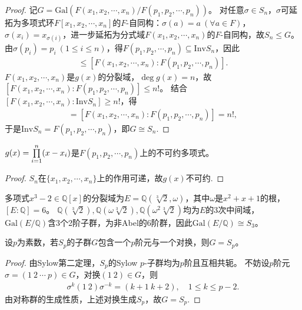 \documentclass[../../main.tex]{subfiles}%
\begin{document}
\begin{proof}
记$G=\mathrm{Gal}(F(x_1,x_2,\cdots,x_n)/F(p_1,p_2,\cdots,p_n))$。
对任意$\sigma\in S_n$，$\sigma$可延拓为多项式环$F[x_1,x_2,\cdots,x_n]$的$F$-自同构：$\sigma(a)=a\ (\forall a\in F)$，$\sigma(x_i)=x_{\sigma(i)}$，进一步延拓为分式域$F(x_1,x_2,\cdots,x_n)$的$F$-自同构，故$S_n\leqslant G$。
由$\sigma(p_i)=p_i\ (1\leqslant i\leqslant n)$，得$F(p_1,p_2,\cdots,p_n)\subseteq \mathrm{Inv}S_n$，因此
\begin{align*}
[F(x_1,x_2,\cdots,x_n):\mathrm{Inv}S_n]\leqslant [F(x_1,x_2,\cdots,x_n):F(p_1,p_2,\cdots,p_n)].
\end{align*}
$F(x_1,x_2,\cdots,x_n)$是$g(x)$的分裂域，$\deg g(x)=n$，故$[F(x_1,x_2,\cdots,x_n):F(p_1,p_2,\cdots,p_n)]\leqslant n!$。
结合$[F(x_1,x_2,\cdots,x_n):\mathrm{Inv}S_n]\geqslant n!$，得
\begin{align*}
[F(x_1,x_2,\cdots,x_n):\mathrm{Inv}S_n]=[F(x_1,x_2,\cdots,x_n):F(p_1,p_2,\cdots,p_n)]=n!,
\end{align*}
于是$\mathrm{Inv}S_n=F(p_1,p_2,\cdots,p_n)$，即$G\cong S_n$.
\end{proof}

\begin{corollary}
$g(x)=\prod\limits_{i=1}^n\limits (x-x_i)$是$F(p_1,p_2,\cdots,p_n)$上的不可约多项式。
\end{corollary}

\begin{proof}
$S_n$在$\{x_1,x_2,\cdots,x_n\}$上的作用可递，故$g(x)$不可约.
\end{proof}

\begin{example}
多项式$x^3-2\in\mathbb{Q}[x]$的分裂域为$E=\mathbb{Q}(\sqrt[3]{2},\omega)$，其中$\omega$是$x^2+x+1$的根，$[E:\mathbb{Q}]=6$。
$\mathbb{Q}(\sqrt[3]{2}),\mathbb{Q}(\omega\sqrt[3]{2}),\mathbb{Q}(\omega^2\sqrt[3]{2})$均为$E$的3次中间域，$\mathrm{Gal}(E/\mathbb{Q})$含3个2阶子群，为非Abel的6阶群，因此$\mathrm{Gal}(E/\mathbb{Q})\cong S_3$。
\end{example}

\begin{lemma}
设$p$为素数，若$S_p$的子群$G$包含一个$p$阶元与一个对换，则$G=S_p$。
\end{lemma}

\begin{proof}
由Sylow第二定理，$S_p$的Sylow $p$-子群均为$p$阶且互相共轭。
不妨设$p$阶元$\sigma=(1\ 2\ \cdots\ p)\in G$，对换$(1\ 2)\in G$，则
\begin{align*}
\sigma^k(1\ 2)\sigma^{-k}=(k+1\ k+2),\quad 1\leqslant k\leqslant p-2.
\end{align*}
由对称群的生成性质，上述对换生成$S_p$，故$G=S_p$.
\end{proof}
\end{document}
